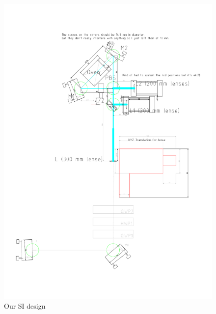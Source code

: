 \begin{figure}[h!]
\begin{center}
	\includegraphics[scale=0.5]{Sagnac_Larger_300mm_Lens.pdf}
\end{center}
\caption{Our SI design}
\label{fig:SI}
\end{figure}

